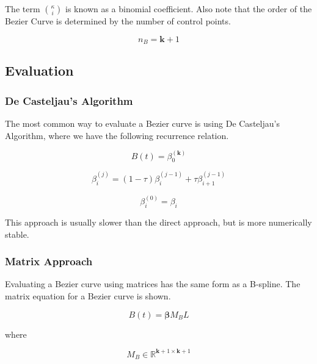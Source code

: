 \documentclass{article}
\begin{document}
The term \(\binom{\kappa}{i}\) is known as a binomial coefficient. Also note that the order of the Bezier Curve is determined by the number of control points. 

\begin{equation}
    n_B = \textbf{k} + 1
\end{equation}

\subsection{Evaluation}

\subsubsection{De Casteljau's Algorithm}
 
 The most common way to evaluate a Bezier curve is using De Casteljau's Algorithm, where we have the following recurrence relation. 
 
 \begin{equation}
     B(t) = \beta_0^{(\textbf{k})}
 \end{equation}
 
 \begin{equation}
     \beta_i^{(j)} = (1-\tau)\beta_i^{(j-1)} + \tau\beta_{i+1}^{(j-1)}
 \end{equation}
 
 \begin{equation}
     \beta_i^{(0)} = \beta_i
 \end{equation}

This approach is usually slower than the direct approach, but is more numerically stable.

\subsubsection{Matrix Approach} \label{Bezier Curve Matrix Approach}
    Evaluating a Bezier curve using matrices has the same form as a B-spline. The matrix equation for a Bezier curve is shown.
    
    \begin{equation}
        B(t) = \boldsymbol{\beta} M_B L
    \end{equation}

        where
    
    \begin{equation}
    M_B \in \mathbb{R}^{\textbf{k}+1 \times \textbf{k}+1}
    \end{equation}
        
\end{document}
